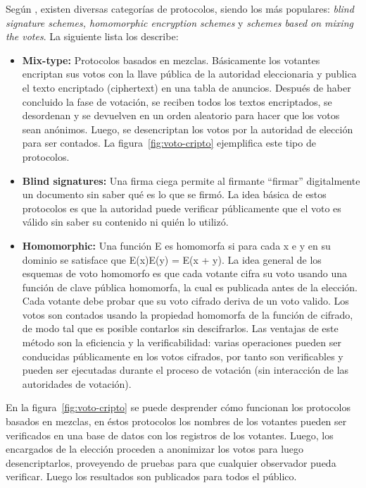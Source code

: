 \newpage

Según \cite{NovotnyMarianInstituteofComputerScience2009}, existen 
diversas categorías de protocolos, siendo los más populares: 
\textit{blind signature schemes, homomorphic encryption schemes} y
\textit{schemes based on mixing the votes}. 
La siguiente lista los describe: \cite{Moran:2006:RUV:2165316.2165338}

\begin{itemize}

	\item \textbf {Mix-type:} Protocolos basados en mezclas. Básicamente los votantes
		encriptan sus votos con la llave pública de la autoridad eleccionaria y publica
		el texto encriptado (ciphertext) en una tabla de anuncios. Después de haber concluido
		la fase de votación, se reciben todos los textos encriptados, se desordenan y se devuelven
		en un orden aleatorio para hacer que los votos sean anónimos. Luego, se desencriptan los votos
		por la autoridad de elección para ser contados. \cite{Bernhard2013} La figura~\ref{fig:voto-cripto}
		ejemplifica este tipo de protocolos.

	\item \textbf {Blind signatures:} Una firma ciega permite al firmante ``firmar'' 
		digitalmente un documento sin saber qué es lo que se firmó. La idea 
		básica de estos protocolos es que la autoridad puede verificar públicamente
		que el voto es válido sin saber su contenido ni quién lo utilizó. 

	\item \textbf {Homomorphic:} Una función E es homomorfa si para cada x e y
		en su dominio se satisface que E(x)E(y) = E(x + y). La idea general de 
		los esquemas de voto homomorfo es que cada votante cifra su voto 
		usando una función de clave pública homomorfa, la cual es publicada 
		antes de la elección. Cada votante debe probar que su voto cifrado 
		deriva de un voto valido. Los votos son contados usando la propiedad homomorfa 
		de la función de cifrado, de modo tal que es posible contarlos sin 
		descifrarlos. Las ventajas de este método son la eficiencia y la verificabilidad: varias operaciones 
		pueden ser conducidas públicamente en los votos cifrados, por tanto 
		son verificables y pueden ser ejecutadas durante el proceso de votación
		(sin interacción de las autoridades de votación).

\end{itemize}

En la figura~\ref{fig:voto-cripto} se puede desprender cómo funcionan los protocolos basados en mezclas,
en éstos protocolos los nombres de los votantes pueden ser verificados en una base de datos con los registros
de los votantes. Luego, los encargados de la elección proceden a anonimizar los votos para luego desencriptarlos,
proveyendo de pruebas para que cualquier observador pueda verificar. Luego los resultados son publicados
para todos el público.

